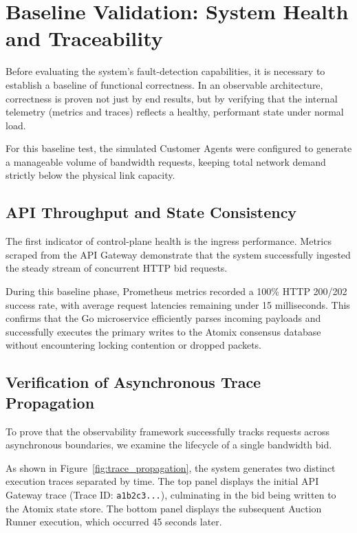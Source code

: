 \section{Baseline Validation: System Health and Traceability}

Before evaluating the system's fault-detection capabilities, it is necessary to establish a baseline of functional correctness. In an observable architecture, correctness is proven not just by end results, but by verifying that the internal telemetry (metrics and traces) reflects a healthy, performant state under normal load.

For this baseline test, the simulated Customer Agents were configured to generate a manageable volume of bandwidth requests, keeping total network demand strictly below the physical link capacity.

\subsection{API Throughput and State Consistency}

The first indicator of control-plane health is the ingress performance. Metrics scraped from the API Gateway demonstrate that the system successfully ingested the steady stream of concurrent HTTP bid requests. 

During this baseline phase, Prometheus metrics recorded a 100\% HTTP 200/202 success rate, with average request latencies remaining under 15 milliseconds. This confirms that the Go microservice efficiently parses incoming payloads and successfully executes the primary writes to the Atomix consensus database without encountering locking contention or dropped packets.

\subsection{Verification of Asynchronous Trace Propagation}

To prove that the observability framework successfully tracks requests across asynchronous boundaries, we examine the lifecycle of a single bandwidth bid. 

As shown in Figure~\ref{fig:trace_propagation}, the system generates two distinct execution traces separated by time. The top panel displays the initial API Gateway trace (Trace ID: \texttt{a1b2c3...}), culminating in the bid being written to the Atomix state store. The bottom panel displays the subsequent Auction Runner execution, which occurred 45 seconds later. 


